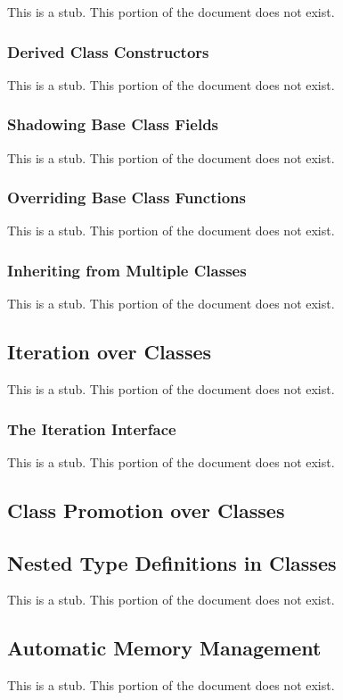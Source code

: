 This is a stub.  This portion of the document does not exist.

\subsubsection{Derived Class Constructors}
\label{Derived_Class_Constructors}

This is a stub.  This portion of the document does not exist.

\subsubsection{Shadowing Base Class Fields}
\label{Shadowing_Base_Class_Fields}

This is a stub.  This portion of the document does not exist.

\subsubsection{Overriding Base Class Functions}
\label{Overriding_Base_Class_Functions}

This is a stub.  This portion of the document does not exist.

\subsubsection{Inheriting from Multiple Classes}
\label{Inheriting_from_Multiple_Classes}

This is a stub.  This portion of the document does not exist.

\subsection{Iteration over Classes}
\label{Iteration_over_Classes}

This is a stub.  This portion of the document does not exist.

\subsubsection{The Iteration Interface}
\label{The_Iteration_Interface}

This is a stub.  This portion of the document does not exist.

\subsection{Class Promotion over Classes}
\label{Scalar Promotion}

\subsection{Nested Type Definitions in Classes}
\label{Nested_Type_Definitions_in_Classes}

This is a stub.  This portion of the document does not exist.

\subsection{Automatic Memory Management}
\label{Automatic_Memory_Management}

This is a stub.  This portion of the document does not exist.
